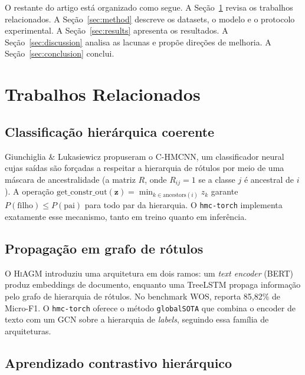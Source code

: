 \documentclass[11pt,a4paper,twoside]{article}
\begin{document}
O restante do artigo está organizado como segue. A Seção~\ref{sec:related} revisa
os trabalhos relacionados. A Seção~\ref{sec:method} descreve os datasets, o modelo
e o protocolo experimental. A Seção~\ref{sec:results} apresenta os resultados. A
Seção~\ref{sec:discussion} analisa as lacunas e propõe direções de melhoria. A
Seção~\ref{sec:conclusion} conclui.

\section{Trabalhos Relacionados}
\label{sec:related}

\subsection{Classificação hierárquica coerente}

Giunchiglia \& Lukasiewicz \cite{giunchiglia2020coherent} propuseram o
\textsc{C-HMCNN}, um classificador neural cujas saídas são forçadas a respeitar a
hierarquia de rótulos por meio de uma máscara de ancestralidade (a matriz $R$, onde
$R_{ij}=1$ se a classe $j$ é ancestral de $i$). A operação
$\text{get\_constr\_out}(\mathbf{z}) = \min_{k \in \text{ancestors}(i)} z_k$
garante $P(\text{filho}) \leq P(\text{pai})$ para todo par da hierarquia.
O \texttt{hmc-torch} implementa exatamente esse mecanismo, tanto em treino quanto em
inferência.

\subsection{Propagação em grafo de rótulos}

O \textsc{HiAGM} \cite{zhou2020hiagm} introduziu uma arquitetura em dois ramos:
um \textit{text encoder} (BERT) produz embeddings de documento, enquanto uma
TreeLSTM propaga informação pelo grafo de hierarquia de rótulos. No benchmark WOS,
reporta 85,82\% de Micro-F1. O \texttt{hmc-torch} oferece o método
\texttt{globalSOTA} que combina o encoder de texto com um GCN sobre a hierarquia de
\textit{labels}, seguindo essa família de arquiteturas.

\subsection{Aprendizado contrastivo hierárquico}
\end{document}
